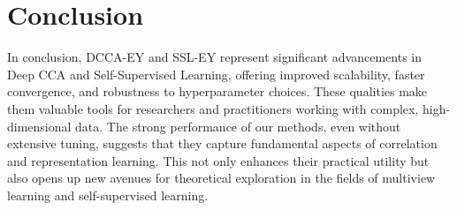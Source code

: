 \section*{Conclusion}

In conclusion, DCCA-EY and SSL-EY represent significant advancements in Deep CCA and Self-Supervised Learning, offering improved scalability, faster convergence, and robustness to hyperparameter choices. These qualities make them valuable tools for researchers and practitioners working with complex, high-dimensional data. The strong performance of our methods, even without extensive tuning, suggests that they capture fundamental aspects of correlation and representation learning. This not only enhances their practical utility but also opens up new avenues for theoretical exploration in the fields of multiview learning and self-supervised learning.